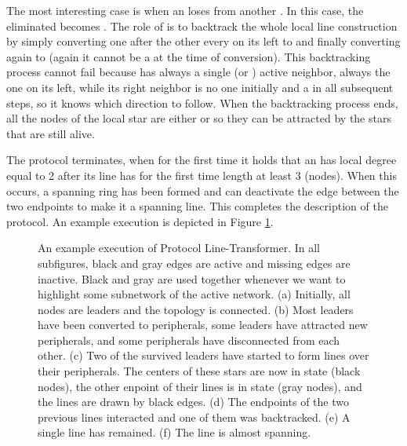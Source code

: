 \documentclass[preprint]{elsarticle}
\begin{document}
The most interesting case is when an  loses from another . In this
case, the eliminated  becomes . The role of  is to backtrack the whole
local line construction by simply converting one after the other every 
on its left to  and finally converting  again to  (again it
cannot be a  at the time of conversion). This backtracking process
cannot fail because  has always a single  (or ) active neighbor,
always the one on its left, while its right neighbor is no one initially
and a  in all subsequent steps, so it knows which direction to follow.
When the backtracking process ends, all the nodes of the local star are
either  or  so they can be attracted by the stars that are still alive.

The protocol terminates, when for the first time it holds that an  has
local degree equal to 2 after its line has for the first time length at least 3 (nodes).
When this occurs, a spanning ring has been formed and  can deactivate
the edge  between the two endpoints to make it a spanning line. This completes the description of the protocol. An example execution is depicted in Figure \ref{fig:line-transformer}.

\begin{figure}[!hbtp]
   \caption{An example execution of Protocol Line-Transformer. In all subfigures, black and gray edges are active and missing edges are inactive. Black and gray are used together whenever we want to highlight some subnetwork of the active network. (a) Initially, all nodes are leaders and the topology is connected. (b) Most leaders have been converted to peripherals, some leaders have attracted new peripherals, and some peripherals have disconnected from each other. (c) Two of the survived leaders have started to form lines over their  peripherals. The centers of these stars are now in state  (black nodes), the other enpoint of their lines is in state  (gray nodes), and the lines are drawn by black edges. (d) The  endpoints of the two previous lines interacted and one of them was backtracked. (e) A single line has remained. (f) The line is almost spanning.} \label{fig:line-transformer}
\end{figure}
\end{document}
